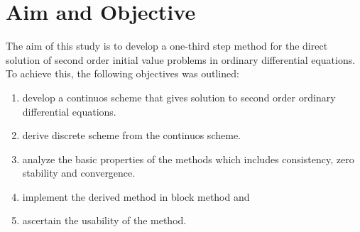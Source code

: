 \documentclass[12pt]{report}
\begin{document}
\section*{Aim and Objective}
\noindent The aim of this study is to develop a one-third step method for the direct solution of second order initial value problems in ordinary differential equations. To achieve this, the following objectives was outlined:
\begin{enumerate}
\item develop a continuos scheme that gives solution to second order ordinary differential equations.
\item  derive discrete scheme from the continuos scheme.
\item analyze the basic properties of the methods which includes consistency, zero stability and convergence.
\item  implement the derived method in block method and
\item  ascertain the usability of the method.
\end{enumerate}

\end{document}

